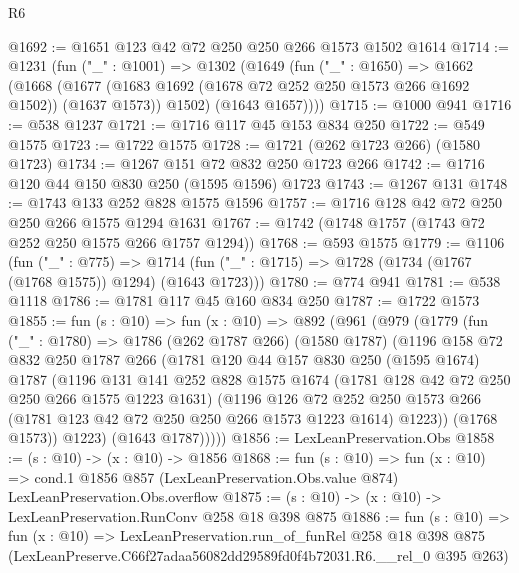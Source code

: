 \begin{lexlean}{R6}
\begin{coremodule}
@1692 := @1651 @123 @42 @72 @250 @250 @266 @1573 @1502 @1614
@1714 := @1231
    (fun ("_" : @1001) =>
    @1302
      (@1649
        (fun ("_" : @1650) =>
        @1662
          (@1668
            (@1677 (@1683 @1692 (@1678 @72 @252 @250 @1573 @266 @1692 @1502)) (@1637 @1573))
            @1502)
          (@1643 @1657))))
@1715 := @1000 @941
@1716 := @538 @1237
@1721 := @1716 @117 @45 @153 @834 @250
@1722 := @549 @1575
@1723 := @1722 @1575
@1728 := @1721 (@262 @1723 @266) (@1580 @1723)
@1734 := @1267 @151 @72 @832 @250 @1723 @266
@1742 := @1716 @120 @44 @150 @830 @250 (@1595 @1596) @1723
@1743 := @1267 @131
@1748 := @1743 @133 @252 @828 @1575 @1596
@1757 := @1716 @128 @42 @72 @250 @250 @266 @1575 @1294 @1631
@1767 := @1742 (@1748 @1757 (@1743 @72 @252 @250 @1575 @266 @1757 @1294))
@1768 := @593 @1575
@1779 := @1106
    (fun ("_" : @775) =>
    @1714 (fun ("_" : @1715) => @1728 (@1734 (@1767 (@1768 @1575)) @1294) (@1643 @1723)))
@1780 := @774 @941
@1781 := @538 @1118
@1786 := @1781 @117 @45 @160 @834 @250
@1787 := @1722 @1573
@1855 := fun (s : @10) =>
  fun (x : @10) =>
  @892
    (@961
      (@979
        (@1779
          (fun ("_" : @1780) =>
          @1786
            (@262 @1787 @266)
            (@1580 @1787)
            (@1196
              @158
              @72
              @832
              @250
              @1787
              @266
              (@1781
                @120
                @44
                @157
                @830
                @250
                (@1595 @1674)
                @1787
                (@1196
                  @131
                  @141
                  @252
                  @828
                  @1575
                  @1674
                  (@1781 @128 @42 @72 @250 @250 @266 @1575 @1223 @1631)
                  (@1196
                    @126
                    @72
                    @252
                    @250
                    @1573
                    @266
                    (@1781 @123 @42 @72 @250 @250 @266 @1573 @1223 @1614)
                    @1223))
                (@1768 @1573))
              @1223)
            (@1643 @1787)))))
@1856 := LexLeanPreservation.Obs
@1858 := (s : @10) -> (x : @10) -> @1856
@1868 := fun (s : @10) =>
  fun (x : @10) =>
  cond.{1} @1856 @857 (LexLeanPreservation.Obs.value @874) LexLeanPreservation.Obs.overflow
@1875 := (s : @10) -> (x : @10) -> LexLeanPreservation.RunConv @258 @18 @398 @875
@1886 := fun (s : @10) =>
  fun (x : @10) =>
  LexLeanPreservation.run_of_funRel
    @258
    @18
    @398
    @875
    (LexLeanPreserve.C66f27adaa56082dd29589fd0f4b72031.R6.__rel_0 @395 @263)
\end{coremodule}
\end{lexlean}
